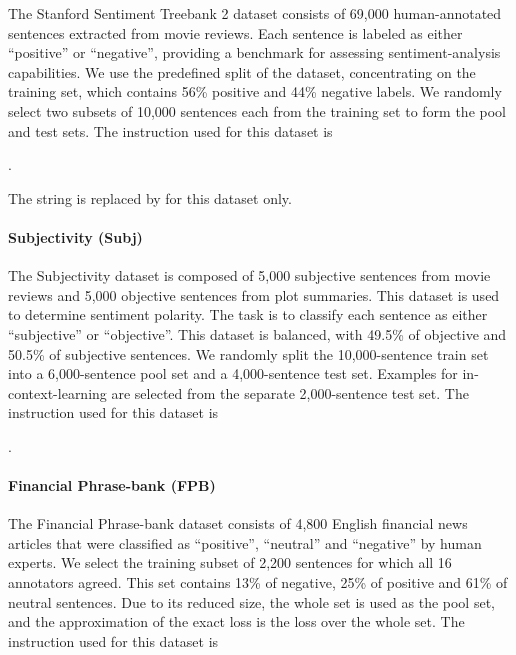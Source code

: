 The Stanford Sentiment Treebank 2 dataset consists of 69,000 human-annotated sentences extracted from movie reviews.
Each sentence is labeled as either ``positive'' or ``negative'', providing a benchmark for assessing sentiment-analysis capabilities.
We use the predefined split of the dataset, concentrating on the training set, which contains 56\% positive and 44\% negative labels.
We randomly select two subsets of 10,000 sentences each from the training set to form the pool and test sets.
The instruction used for this dataset is

.

The string  is replaced by  for this dataset only.


\paragraph{Subjectivity (Subj)}

The Subjectivity dataset is composed of 5,000 subjective sentences from movie reviews and 5,000 objective sentences from plot summaries.
This dataset is used to determine sentiment polarity.
The task is to classify each sentence as either ``subjective'' or ``objective''.
This dataset is balanced, with 49.5\% of objective and 50.5\% of subjective sentences.
We randomly split the 10,000-sentence train set into a 6,000-sentence pool set and a 4,000-sentence test set.
Examples for in-context-learning are selected from the separate 2,000-sentence test set.
The instruction used for this dataset is

.


\paragraph{Financial Phrase-bank (FPB)}

The Financial Phrase-bank dataset consists of 4,800 English financial news articles that were classified as ``positive'', ``neutral'' and ``negative'' by human experts.
We select the training subset of 2,200 sentences for which all 16 annotators agreed. This set contains 13\% of negative, 25\% of positive and 61\% of neutral sentences.
Due to its reduced size, the whole set is used as the pool set, and the approximation of the exact loss is the loss over the whole set.
The instruction used for this dataset is

